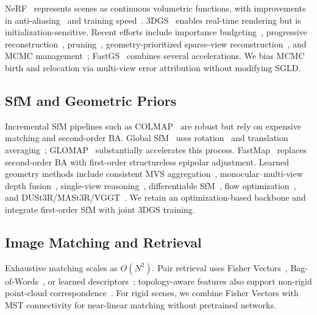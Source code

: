 \documentclass[sigconf]{acmart}
\begin{document}
NeRF~\cite{mildenhall2021nerf} represents scenes as continuous volumetric functions, with improvements in anti-aliasing~\cite{barron2021mip,barron2022mip} and training speed~\cite{muller2022instant}. 3DGS~\cite{kerbl3Dgaussians} enables real-time rendering but is initialization-sensitive. Recent efforts include importance budgeting~\cite{mallick2024taming}, progressive reconstruction~\cite{chen2025dashgaussian}, pruning~\cite{fang2024mini,hanson2025speedy}, geometry-prioritized sparse-view reconstruction~\cite{wu2025sparse2dgs}, and MCMC management~\cite{mcmc3dgs}; FastGS~\cite{ren2025fastgs} combines several accelerations. We bias MCMC birth and relocation via multi-view error attribution without modifying SGLD.

\subsection{SfM and Geometric Priors}

Incremental SfM pipelines such as COLMAP~\cite{colmap} are robust but rely on expensive matching and second-order BA. Global SfM~\cite{moulon2017openmvg,sweeney2015theia} uses rotation~\cite{hartley2013rotation,wilson2020distribution} and translation averaging~\cite{govindu2001combining,martinec2007robust}; GLOMAP~\cite{pan2024glomap} substantially accelerates this process. FastMap~\cite{fastmap} replaces second-order BA with first-order structureless epipolar adjustment. Learned geometry methods include consistent MVS aggregation~\cite{wu2024gomvs}, monocular--multi-view depth fusion~\cite{li2023learning}, single-view reasoning~\cite{li2024know,li2025lari}, differentiable SfM~\cite{wang2024vggsfm}, flow optimization~\cite{smith2024flowmap}, and DUSt3R/MASt3R/VGGT~\cite{wang2024dust3r,leroy2024grounding,wang2025vggt}. We retain an optimization-based backbone and integrate first-order SfM with joint 3DGS training.

\subsection{Image Matching and Retrieval}

Exhaustive matching scales as $O(N^2)$. Pair retrieval uses Fisher Vectors~\cite{perronnin2010fisher}, Bag-of-Words~\cite{sivic2003video,jegou2010aggregating}, or learned descriptors~\cite{arandjelovic2016netvlad,megaloc}; topology-aware features also support non-rigid point-cloud correspondence~\cite{chen2026topology}. For rigid scenes, we combine Fisher Vectors with MST connectivity for near-linear matching without pretrained networks.
\end{document}
